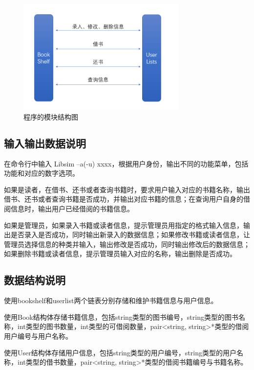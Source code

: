 \documentclass{ctexart}
\begin{document}
    \begin{figure}[h] %
        \centering
        \includegraphics[width=0.75\textwidth]{src/modules.png}
        \caption{程序的模块结构图}   
    \end{figure}
    
    \subsection{输入输出数据说明}
    在命令行中输入 Libsim –a(-u) xxxx，根据用户身份，输出不同的功能菜单，包括功能和对应的数字选项。
    
    如果是读者，在借书、还书或者查询书籍时，要求用户输入对应的书籍名称，输出借书、还书或者查询书籍是否成功，并输出对应书籍的信息；在查询用户自身的借阅信息时，输出用户已经借阅的书籍信息。
    
    如果是管理员，如果录入书籍或读者信息，提示管理员用指定的格式输入信息，输出是否录入是否成功，同时输出新录入的数据信息；如果修改书籍或读者信息，让管理员选择信息的种类并输入，输出修改是否成功，同时输出修改后的数据信息；如果删除书籍或读者信息，提示管理员输入对应的名称，输出删除是否成功。
    
    
    \subsection{数据结构说明}
    使用bookshelf和userlist两个链表分别存储和维护书籍信息与用户信息。
    
    使用Book结构体存储书籍信息，包括string类型的图书编号，string类型的图书名称，int类型的图书数量，int类型的可借阅数量，pair<string, string>*类型的借阅用户编号与用户名称。
    
    使用User结构体存储用户信息，包括string类型的用户编号，string类型的用户名称，int类型的借书数量，pair<string, string>*类型的借阅书籍编号与书籍名称。
    
\end{document}
